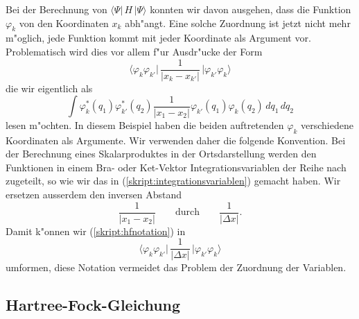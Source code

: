 Bei der Berechnung von $\langle\Psi|\,H\,|\Psi\rangle$ konnten wir
davon ausgehen, dass die Funktion $\varphi_k$ von den Koordinaten
$x_k$ abh"angt. Eine solche Zuordnung ist jetzt nicht mehr m"oglich,
jede Funktion kommt mit jeder Koordinate als Argument vor.
Problematisch wird dies vor allem f"ur Ausdr"ucke der Form
\begin{equation}
\biggl\langle\varphi_k\varphi_{k'}\biggl|\,
\frac{1}{|x_k-x_{k'}|}
\,\biggr|\varphi_{k'}\varphi_k\biggr\rangle
\label{skript:hfnotation}
\end{equation}
die wir eigentlich als
\begin{equation}
\int \varphi_k^*(q_1)\varphi_{k'}^*(q_2)
\frac{1}{|x_1-x_2|}
\varphi_{k'}(q_1)\varphi_k(q_2)\,dq_1\,dq_2
\label{skript:integrationsvariablen}
\end{equation}
lesen m"ochten. In diesem Beispiel haben die beiden auftretenden $\varphi_k$ 
verschiedene Koordinaten als Argumente.
Wir verwenden daher die folgende Konvention.
Bei der Berechnung eines Skalarproduktes in der Ortsdarstellung 
werden den Funktionen in einem Bra- oder Ket-Vektor Integrationsvariablen
der Reihe nach zugeteilt, so wie wir das in (\ref{skript:integrationsvariablen})
gemacht haben. 
Wir ersetzen ausserdem den inversen Abstand 
\[
\frac{1}{|x_1-x_2|}
\qquad
\text{durch}
\qquad
\frac{1}{|\Delta x|}.
\]
Damit k"onnen wir (\ref{skript:hfnotation}) in
\[
\biggl\langle \varphi_k\varphi_{k'}\biggl|\,
\frac1{|\Delta x|}
\,\biggr|\varphi_{k'}\varphi_k\biggl\rangle
\]
umformen, diese Notation vermeidet das Problem der Zuordnung der Variablen.

\subsection{Hartree-Fock-Gleichung}
%
